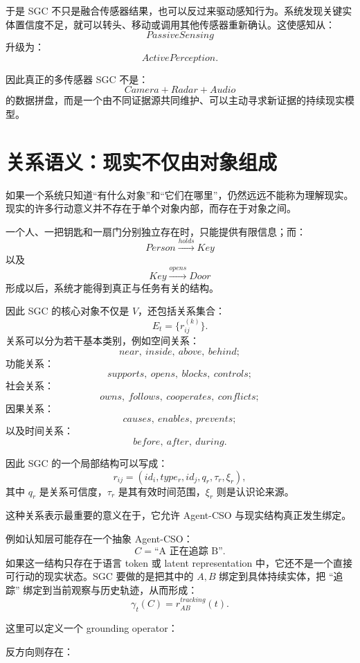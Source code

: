 于是 SGC 不只是融合传感器结果，也可以反过来驱动感知行为。系统发现关键实体置信度不足，就可以转头、移动或调用其他传感器重新确认。这使感知从：
\[
PassiveSensing
\]
升级为：
\[
ActivePerception.
\]

因此真正的多传感器 SGC 不是：
\[
Camera + Radar + Audio
\]
的数据拼盘，而是一个由不同证据源共同维护、可以主动寻求新证据的持续现实模型。

\section{关系语义：现实不仅由对象组成}

如果一个系统只知道“有什么对象”和“它们在哪里”，仍然远远不能称为理解现实。现实的许多行动意义并不存在于单个对象内部，而存在于对象之间。

一个人、一把钥匙和一扇门分别独立存在时，只能提供有限信息；而：
\[
Person
\xrightarrow{holds}
Key
\]
以及
\[
Key
\xrightarrow{opens}
Door
\]
形成以后，系统才能得到真正与任务有关的结构。

因此 SGC 的核心对象不仅是 \(V\)，还包括关系集合：
\[
E_t
=
\{
r_{ij}^{(k)}
\}.
\]
关系可以分为若干基本类别，例如空间关系：
\[
near,\ inside,\ above,\ behind;
\]
功能关系：
\[
supports,\ opens,\ blocks,\ controls;
\]
社会关系：
\[
owns,\ follows,\ cooperates,\ conflicts;
\]
因果关系：
\[
causes,\ enables,\ prevents;
\]
以及时间关系：
\[
before,\ after,\ during.
\]

因此 SGC 的一个局部结构可以写成：
\[
r_{ij}
=
\left(
id_i,
type_r,
id_j,
q_r,
\tau_r,
\xi_r
\right),
\]
其中 \(q_r\) 是关系可信度，\(\tau_r\) 是其有效时间范围，\(\xi_r\) 则是认识论来源。

这种关系表示最重要的意义在于，它允许 Agent-CSO 与现实结构真正发生绑定。

例如认知层可能存在一个抽象 Agent-CSO：
\[
C=
\text{``A 正在追踪 B''}.
\]
如果这一结构只存在于语言 token 或 latent representation 中，它还不是一个直接可行动的现实状态。SGC 要做的是把其中的 \(A,B\) 绑定到具体持续实体，把 ``追踪'' 绑定到当前观察与历史轨迹，从而形成：
\[
\gamma_t(C)
=
r_{AB}^{tracking}(t).
\]

这里可以定义一个 grounding operator：
\begin{statementbox}
\centering
{}
\end{statementbox}

反方向则存在：
\begin{statementbox}
\centering
{}
\end{statementbox}

